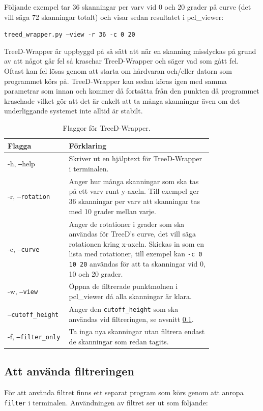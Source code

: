 \documentclass[a4paper,titlepage,12pt]{article}
\begin{document}
	Följande exempel tar 36 skanningar per varv vid 0 och 20 grader på curve (det vill säga 72 skanningar totalt) och visar sedan resultatet i pcl\_viewer:
	
	\texttt{treed\_wrapper.py --view -r 36 -c 0 20}
	
	TreeD-Wrapper är uppbyggd på så sätt att när en skanning misslyckas på grund av att något går fel så kraschar TreeD-Wrapper och säger vad som gått fel. Oftast kan fel lösas genom att starta om hårdvaran och/eller datorn som programmet körs på. TreeD-Wrapper kan sedan köras igen med samma parametrar som innan och kommer då fortsätta från den punkten då programmet kraschade vilket gör att det är enkelt att ta många skanningar även om det underliggande systemet inte alltid är stabilt.
		
	\begin{table}[H]
		\centering
		\caption{Flaggor för TreeD-Wrapper.}
		\label{tab:treedwrapper_flaggor}
		
		\begin{tabular}{p{0.2\linewidth}p{0.6\linewidth}}
			Flagga & Förklaring \\
			\hline
			-h, \texttt{--}help & Skriver ut en hjälptext för TreeD-Wrapper i terminalen. \\
			\hline
			-r, \texttt{--rotation} & Anger hur många skanningar som ska tas på ett varv runt y-axeln. Till exempel ger 36 skanningar per varv att skanningar tas med 10 grader mellan varje. \\
			\hline
			-c, \texttt{--curve} & Anger de rotationer i grader som ska användas för TreeD's curve, det vill säga rotationen kring x-axeln. Skickas in som en lista med rotationer, till exempel kan \texttt{-c 0 10 20} användas för att ta skanningar vid 0, 10 och 20 grader. \\
			\hline
			-w, \texttt{--view} & Öppna de filtrerade punktmolnen i pcl\_viewer då alla skanningar är klara. \\
			\hline
			\texttt{--cutoff\_height} & Anger den \texttt{cutoff\_height} som ska användas vid filtreringen, se avsnitt \ref{sec:filtrering}. \\
			\hline
			-f, \texttt{--filter\_only} & Ta inga nya skanningar utan filtrera endast de skanningar som redan tagits. \\
			\hline
		\end{tabular}
		
	\end{table}
	
	\subsection{Att använda filtreringen}
	\label{sec:filtrering}
	För att använda filtret finns ett separat program som körs genom att anropa \texttt{filter} i terminalen. Användningen av filtret ser ut som följande:
	
\end{document}
